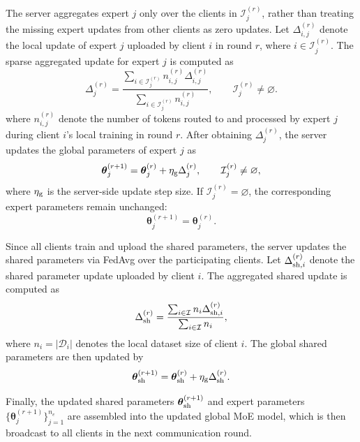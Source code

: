\documentclass[conference]{IEEEtran}
\begin{document}
The server aggregates expert $j$ only over the clients in $\mathcal{I}_j^{(r)}$, rather than treating the missing expert updates from other clients as zero updates. Let $\Delta_{i,j}^{(r)}$ denote the local update of expert $j$ uploaded by client $i$ in round $r$, where $i\in\mathcal{I}_j^{(r)}$. The sparse aggregated update for expert $j$ is computed as
\begin{equation}
\label{eq:expert_sparse_agg}
\Delta_j^{(r)}
=
\frac{
\sum_{i\in\mathcal{I}_j^{(r)}}
n_{i,j}^{(r)}
\Delta_{i,j}^{(r)}
}{
\sum_{i\in\mathcal{I}_j^{(r)}}
n_{i,j}^{(r)}
},
\qquad
\mathcal{I}_j^{(r)}\ne\varnothing .
\end{equation}
where $n_{i,j}^{(r)}$ denote the number of tokens routed to and processed by expert $j$ during client $i$'s local training in round $r$. After obtaining $\Delta_j^{(r)}$, the server updates the global parameters of expert $j$ as
\begin{equation}
\label{eq:expert_update}
\boldsymbol{\theta}_{j}^{(r+1)}
=
\boldsymbol{\theta}_{j}^{(r)}
+
\eta_{\rm g}
\Delta_j^{(r)},
\qquad
\mathcal{I}_j^{(r)}\ne\varnothing ,
\end{equation}
where $\eta_{\rm g}$ is the server-side update step size. If $\mathcal{I}_j^{(r)}=\varnothing$, the corresponding expert parameters remain unchanged:
\begin{equation}
\label{eq:expert_no_update}
\boldsymbol{\theta}_{j}^{(r+1)}
=
\boldsymbol{\theta}_{j}^{(r)}.
\end{equation}

Since all clients train and upload the shared parameters, the server updates the shared parameters via FedAvg over the participating clients. Let $\Delta_{{\rm sh},i}^{(r)}$ denote the shared parameter update uploaded by client $i$. The aggregated shared update is computed as
\begin{equation}
\label{eq:shared_agg}
\Delta_{\rm sh}^{(r)}
=
\frac{
\sum_{i\in\mathcal{I}}
n_i
\Delta_{{\rm sh},i}^{(r)}
}{
\sum_{i\in\mathcal{I}}
n_i
},
\end{equation}
where $n_i=|\mathcal{D}_i|$ denotes the local dataset size of client $i$. The global shared parameters are then updated by
\begin{equation}
\label{eq:shared_update}
\boldsymbol{\theta}_{\rm sh}^{(r+1)}
=
\boldsymbol{\theta}_{\rm sh}^{(r)}
+
\eta_{\rm g}
\Delta_{\rm sh}^{(r)} .
\end{equation}

Finally, the updated shared parameters $\boldsymbol{\theta}_{\rm sh}^{(r+1)}$ and expert parameters $\{\boldsymbol{\theta}_{j}^{(r+1)}\}_{j=1}^{n_e}$ are assembled into the updated global MoE model, which is then broadcast to all clients in the next communication round.
\end{document}
